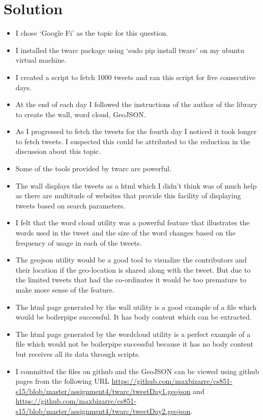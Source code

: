 \section{Solution}
\begin{itemize}
\item I chose `Google Fi' as the topic for this question.
\item I installed the twarc package using `sudo pip install twarc' on my ubuntu virtual machine.
\item I created a script to fetch 1000 tweets and ran this script for five consecutive days.
\item At the end of each day I followed the instructions of the author of the library to create the wall, word cloud, GeoJSON.
\item As I progressed to fetch the tweets for the fourth day I noticed it took longer to fetch tweets. I suspected this could be attributed to the reduction in the discussion about this topic.
\item Some of the tools provided by twarc are powerful.
\item The wall displays the tweets as a html which I didn't think was of much help as there are multitude of websites that provide this facility of displaying tweets based on search parameters.
\item I felt that the word cloud utility was a powerful feature that illustrates the words used in the tweet and the size of the word changes based on the frequency of usage in each of the tweets.
\item The geojson utility would be a good tool to visualize the contributors and their location if the geo-location is shared along with the tweet. But due to the limited tweets that had the co-ordinates it would be too premature to make more sense of the feature.
\item The html page generated by the wall utility is a good example of a file which would be boilerpipe successful. It has body content which can be extracted.
\item The html page generated by the wordcloud utility is a perfect example of a file which would not be boilerpipe successful because it has no body content but receives all its data through scripts.
\item I committed the files on github and the GeoJSON can be viewed using github pages from the following URL \url{https://github.com/maxbizarre/cs851-s15/blob/master/assignment4/twarc/tweetDay1.geojson} and \url{https://github.com/maxbizarre/cs851-s15/blob/master/assignment4/twarc/tweetDay2.geojson}.
\end{itemize}

